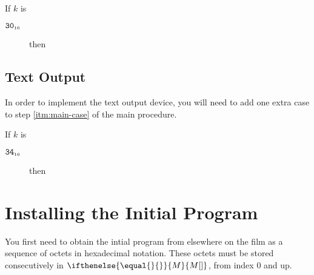 \documentclass[a4paper,12pt]{article}
\newcommand{\num}[1]{\texttt{#1}}
\newcommand{\hex}[1]{\num{#1}_{\textup{\tiny 16}}}
\newcommand{\MEM}[1]{\ifthenelse{\equal{#1}{}}{M}{M[#1]}}
\newcommand{\proc}[1]{\textsc{#1}}
\newcommand{\op}[1]{$#1$}
\newcommand{\NEWFRAME}  [1]{\op{\hex{30}}}
\newcommand{\PUTCHAR}   [1]{\op{\hex{34}}}
\begin{document}
\begin{stepnumbers}[start=3]
\item If $k$ is
  \begin{description}
  \item[\NEWFRAME{}] then
  \end{description}
\end{stepnumbers}

\subsection{Text Output}

In order to implement the text output device, you will need to add one extra case to step \ref{itm:main-case} of the main procedure.

\begin{stepnumbers}[start=3]
  \setcounter{enumi}{2}
\item If $k$ is
  \begin{description}
  \item[\PUTCHAR{}] then
  \end{description}
\end{stepnumbers}

\section{Installing the Initial Program}

You first need to obtain the intial program from elsewhere on the film as a sequence of octets in hexadecimal notation.
These octets must be stored consecutively in $\MEM{}$, from index $0$ and up.
\end{document}
